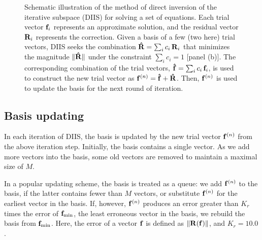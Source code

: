 \documentclass[reprint,superscriptaddress]{revtex4-1}
\begin{document}
\begin{figure}
  \caption{\label{fig:scheme}
    Schematic illustration of the method of
    direct inversion of the iterative subspace (DIIS)
    for solving a set of equations.
    Each trial vector $\mathbf{f}_i$
    represents an approximate solution,
    and the residual vector $\mathbf{R}_i$
    represents the correction.
    Given a basis of a few (two here) trial vectors,
    DIIS seeks the combination
    $\mathbf{\hat R} = \sum_i c_i \, \mathbf{R}_i$
    that minimizes the magnitude
    $\| \mathbf{\hat R} \|$
    under the constraint
    $\sum_i c_i = 1$ [panel (b)].
    The corresponding combination
    of the trial vectors,
    $\mathbf{\hat f} = \sum_i c_i \, \mathbf{f}_i$,
    is used to construct
    the new trial vector as
    $\mathbf{f}^{(n)} = \mathbf{\hat f} + \mathbf{\hat R}$.
    Then, $\mathbf{f}^{(n)}$ is used to
    update the basis
    for the next round of iteration.
  }
\end{figure}




\subsection{Basis updating}



In each iteration of DIIS,
the basis is updated
by the new trial vector $\mathbf{f}^{(n)}$
from the above iteration step.
%
Initially,
the basis contains a single vector.
%
As we add more vectors into the basis,
some old vectors are removed
to maintain a maximal size of $M$.



In a popular updating scheme\cite{kovalenko1999},
the basis is treated as a queue:
%
we add $\mathbf{f}^{(n)}$ to the basis,
if the latter contains fewer than $M$ vectors,
%
or substitute $\mathbf{f}^{(n)}$ for the earliest vector in the basis.
%
If, however, $\mathbf{f}^{(n)}$
produces an error greater than
$K_r$ times the error of
$\mathbf{f}_\mathrm{min}$,
the least erroneous vector in the basis,
%
we rebuild the basis
from $\mathbf{f}_\mathrm{min}$.
%
Here, the error of a vector $\mathbf{f}$ is defined as
$\| \mathbf{R}(\mathbf{f}) \|$,
and
$K_r = 10.0$\cite{
kovalenko1999}.
\end{document}
